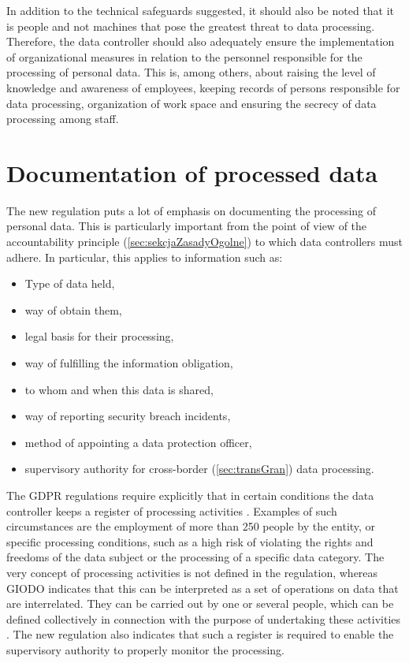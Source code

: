 \documentclass[en, noamssymb]{mgr}
\begin{document}
In addition to the technical safeguards suggested, it should also be noted that it is people and not machines that pose the greatest threat to data processing. Therefore, the data controller should also adequately ensure the implementation of organizational measures in relation to the personnel responsible for the processing of personal data. This is, among others, about raising the level of knowledge and awareness of employees, keeping records of persons responsible for data processing, organization of work space and ensuring the secrecy of data processing among staff.

\section{Documentation of processed data}

The new regulation puts a lot of emphasis on documenting the processing of personal data. This is particularly important from the point of view of the accountability principle (\ref{sec:sekcjaZasadyOgolne}) to which data controllers must adhere. In particular, this applies to information such as:

\begin{itemize}

\item Type of data held,
\item way of obtain them,
\item legal basis for their processing,
\item way of fulfilling the information obligation,
\item to whom and when this data is shared,
\item way of reporting security breach incidents,
\item method of appointing a data protection officer,
\item supervisory authority for cross-border (\ref{sec:transGran}) data processing.

\end{itemize}

The GDPR regulations require explicitly that in certain conditions the data controller keeps a register of processing activities \cite{rodo_art30}. Examples of such circumstances are the employment of more than 250 people by the entity, or specific processing conditions, such as a high risk of violating the rights and freedoms of the data subject or the processing of a specific data category. The very concept of processing activities is not defined in the regulation, whereas GIODO indicates that this can be interpreted as a set of operations on data that are interrelated. They can be carried out by one or several people, which can be defined collectively in connection with the purpose of undertaking these activities \cite{giodo_dokumentacja}. The new regulation also indicates that such a register is required to enable the supervisory authority to properly monitor the processing.
\end{document}
